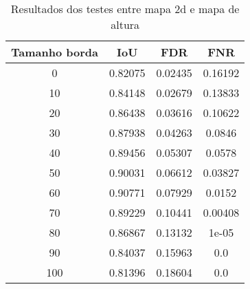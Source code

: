\begin{table}[h]
    \centering
    \caption{Resultados dos testes entre mapa 2d e mapa de altura}
    \label{tab:border_2d_solution_output_2d_output_3d}
    \begin{tabular}{|c|c|c|c|}
        \hline
        Tamanho borda & IoU & FDR & FNR \\
        \hline
        0 & 0.82075 & 0.02435 & 0.16192\\
        10 & 0.84148 & 0.02679 & 0.13833\\
        20 & 0.86438 & 0.03616 & 0.10622\\
        30 & 0.87938 & 0.04263 & 0.0846\\
        40 & 0.89456 & 0.05307 & 0.0578\\
        50 & 0.90031 & 0.06612 & 0.03827\\
        60 & 0.90771 & 0.07929 & 0.0152\\
        70 & 0.89229 & 0.10441 & 0.00408\\
        80 & 0.86867 & 0.13132 & 1e-05\\
        90 & 0.84037 & 0.15963 & 0.0\\
        100 & 0.81396 & 0.18604 & 0.0\\
        \hline
    \end{tabular}
\end{table}


